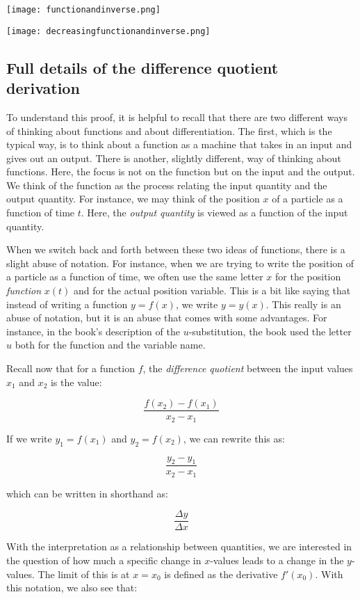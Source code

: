 \documentclass[10pt]{amsart}
\begin{document}
\texttt{[image: functionandinverse.png]}

\texttt{[image: decreasingfunctionandinverse.png]}


\subsection{Full details of the difference quotient derivation}

To understand this proof, it is helpful to recall that there are two
different ways of thinking about functions and about
differentiation. The first, which is the typical way, is to think
about a function as a machine that takes in an input and gives out an
output. There is another, slightly different, way of thinking about
functions. Here, the focus is not on the function but on the input and
the output. We think of the function as the process relating the input
quantity and the output quantity. For instance, we may think of the
position $x$ of a particle as a function of time $t$. Here, the {\em
output quantity} is viewed as a function of the input quantity.

When we switch back and forth between these two ideas of functions,
there is a slight abuse of notation. For instance, when we are trying
to write the position of a particle as a function of time, we often
use the same letter $x$ for the position {\em function} $x(t)$ and for
the actual position variable. This is a bit like saying that instead
of writing a function $y = f(x)$, we write $y = y(x)$. This really is
an abuse of notation, but it is an abuse that comes with some
advantages. For instance, in the book's description of the
$u$-substitution, the book used the letter $u$ both for the function
and the variable name.

Recall now that for a function $f$, the {\em difference quotient} between the
input values $x_1$ and $x_2$ is the value:

$$\frac{f(x_2) - f(x_1)}{x_2 - x_1}$$

If we write $y_1 = f(x_1)$ and $y_2 = f(x_2)$, we can rewrite this as:

$$\frac{y_2 - y_1}{x_2 - x_1}$$

which can be written in shorthand as:

$$\frac{\Delta y}{\Delta x}$$

With the interpretation as a relationship between quantities, we are
interested in the question of how much a specific change in $x$-values
leads to a change in the $y$-values. The limit of this is at $x = x_0$
is defined as the derivative $f'(x_0)$. With this notation, we also
see that:
\end{document}
